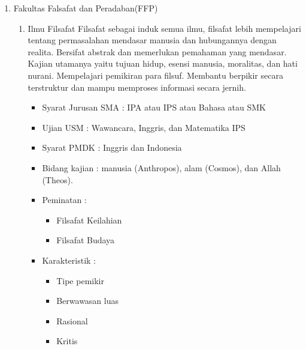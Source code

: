 \documentclass[a4paper,twoside]{article}
\begin{document}
\begin{enumerate}
\begin{enumerate}
			\item Fakultas Falsafat dan Peradaban(FFP)
			\begin{enumerate}
				\item Ilmu Filsafat
					Filsafat sebagai induk semua ilmu, filsafat lebih mempelajari tentang permasalahan mendasar manusia dan hubungannya dengan realita. Bersifat abstrak dan memerlukan pemahaman yang mendasar. Kajian utamanya yaitu tujuan hidup, esensi manusia, moralitas, dan hati nurani. Mempelajari pemikiran para filsuf. Membantu berpikir secara terstruktur dan mampu memproses informasi secara jernih.
					\begin{itemize}
						\item Syarat Jurusan SMA : IPA atau IPS atau Bahasa atau SMK
						\item Ujian USM : Wawancara, Inggris, dan Matematika IPS
						\item Syarat PMDK : Inggris dan Indonesia
						\item Bidang kajian : manusia (Anthropos), alam (Cosmos), dan Allah (Theos).
						\item Peminatan :
						\begin{itemize}
							\item Filsafat Keilahian
							\item Filsafat Budaya
						\end{itemize}
						\item Karakteristik :
						\begin{itemize}
							\item Tipe pemikir
							\item Berwawasan luas
							\item Rasional
							\item Kritis
						\end{itemize}
					\end{itemize}
			\end{enumerate}
			

\end{enumerate}
\end{enumerate}
\end{document}
